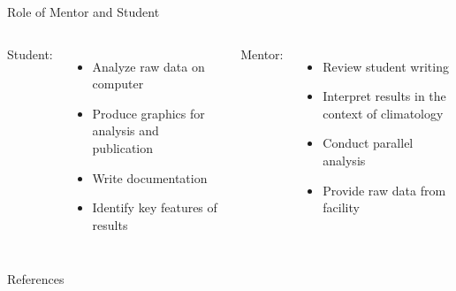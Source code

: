 \documentclass{beamer}
\begin{document}
\begin{frame}{Role of Mentor and Student}
  \begin{columns}[t]
    Student:
    \begin{itemize}
    \item Analyze raw data on computer
    \item Produce graphics for analysis and publication
    \item Write documentation
    \item Identify key features of results
    \end{itemize}
    Mentor:
    \begin{itemize}
    \item Review student writing
    \item Interpret results in the context of climatology
    \item Conduct parallel analysis
    \item Provide raw data from facility
    \end{itemize}
  \end{columns}
\end{frame}

\begin{frame}{References}
  
  \fontsize{4pt}{5}\selectfont
  
\end{frame}
\end{document}
